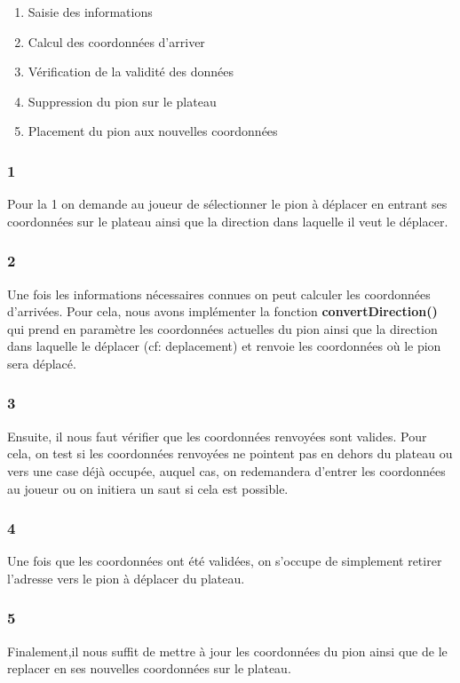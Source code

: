 \documentclass{article}
\begin{document}
\begin{enumerate}
    \item Saisie des informations
    \item Calcul des coordonnées d'arriver
    \item Vérification de la validité des données
    \item Suppression du pion sur le plateau
    \item Placement du pion aux nouvelles coordonnées
\end{enumerate}

\subsubsection{1}
Pour la 1 on demande au joueur de sélectionner le pion à déplacer en entrant ses coordonnées sur le plateau ainsi que la direction dans laquelle il veut le déplacer.

\subsubsection{2}
Une fois les informations nécessaires connues on peut calculer les coordonnées d'arrivées. Pour cela, nous avons implémenter la fonction \textbf{convertDirection()} qui prend en paramètre les coordonnées actuelles du pion ainsi que la direction dans laquelle le déplacer (cf: deplacement) et renvoie les coordonnées où le pion sera déplacé.

\subsubsection{3}
Ensuite, il nous faut vérifier que les coordonnées renvoyées sont valides. Pour cela, on test si les coordonnées renvoyées ne pointent pas en dehors du plateau ou vers une case déjà occupée, auquel cas, on redemandera d'entrer les coordonnées au joueur ou on initiera un saut si cela est possible.

\subsubsection{4}
Une fois que les coordonnées ont été validées, on s'occupe de simplement retirer l'adresse vers le pion à déplacer du plateau. \\

\subsubsection{5}
Finalement,il nous suffit de mettre à jour les coordonnées du pion ainsi que de le replacer en ses nouvelles coordonnées sur le plateau.
\end{document}
